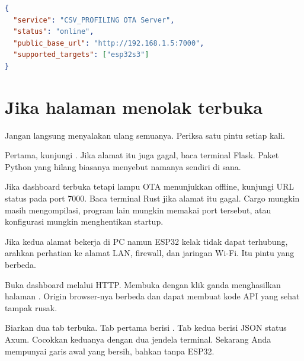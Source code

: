 \begin{lstlisting}[language=JSON,numbers=none]
{
  "service": "CSV_PROFILING OTA Server",
  "status": "online",
  "public_base_url": "http://192.168.1.5:7000",
  "supported_targets": ["esp32s3"]
}
\end{lstlisting}

\section{Jika halaman menolak terbuka}

Jangan langsung menyalakan ulang semuanya. Periksa satu pintu setiap kali.

Pertama, kunjungi . Jika alamat itu juga gagal, baca terminal Flask. Paket Python yang hilang biasanya menyebut namanya sendiri di sana.

Jika dashboard terbuka tetapi lampu OTA menunjukkan offline, kunjungi URL status pada port 7000. Baca terminal Rust jika alamat itu gagal. Cargo mungkin masih mengompilasi, program lain mungkin memakai port tersebut, atau konfigurasi mungkin menghentikan startup.

Jika kedua alamat bekerja di PC namun ESP32 kelak tidak dapat terhubung, arahkan perhatian ke alamat LAN, firewall, dan jaringan Wi-Fi. Itu pintu yang berbeda.

Buka dashboard melalui HTTP. Membuka  dengan klik ganda menghasilkan halaman . Origin browser-nya berbeda dan dapat membuat kode API yang sehat tampak rusak.

\begin{checkpoint}
Biarkan dua tab terbuka. Tab pertama berisi . Tab kedua berisi JSON status Axum. Cocokkan keduanya dengan dua jendela terminal. Sekarang Anda mempunyai garis awal yang bersih, bahkan tanpa ESP32.
\end{checkpoint}

